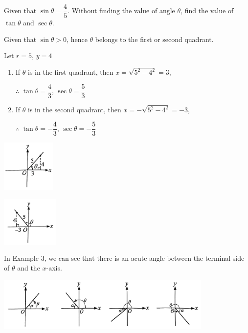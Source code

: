 \documentclass{report}
\begin{document}
\begin{question}
    Given that $\sin\theta = \dfrac{4}{5}$. Without finding the value of angle $\theta$, find the value of $\tan\theta$ and $\sec\theta$.

    \sol{}

    \noindent Given that $\sin\theta > 0$, hence $\theta$ belongs to the first or second quadrant. 

    \vspace{-1em}
    \begin{multicols}{2}
        \noindent Let $r = 5$, $y = 4$
        \vspace{-1em}
    \begin{enumerate}[label=(\roman*),leftmargin=*]
        \item If $\theta$ is in the first quadrant, then $x = \sqrt{5^2 - 4^2} = 3$,
        
        $\therefore$ $\tan\theta = \dfrac{4}{3}$, $\sec\theta = \dfrac{5}{3}$

        \item If $\theta$ is in the second quadrant, then $x = -\sqrt{5^2 - 4^2} = -3$,
        
        $\therefore$ $\tan\theta = -\dfrac{4}{3}$, $\sec\theta = -\dfrac{5}{3}$
    \end{enumerate}
    \vfill\null

    \begin{center}
        \includegraphics[width=0.2\textwidth]{assets/9-7.jpg}
    \end{center}
    \vspace{-3em}
    \begin{center}
        \includegraphics[width=0.21\textwidth]{assets/9-8.jpg}
    \end{center}
    \end{multicols}
\end{question}

\vspace{-1em}
In Example 3, we can see that there is an acute angle between the terminal side of $\theta$ and the $x$-axis.
\begin{center}
    \includegraphics[width=0.8\textwidth]{assets/9-9.jpg}
\end{center}
\end{document}
